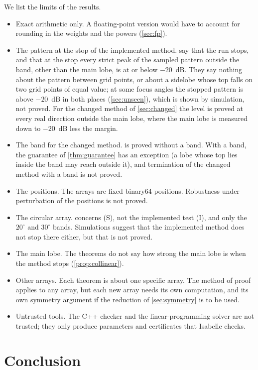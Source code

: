 \documentclass[11pt]{amsart}
\theoremstyle{plain}
\theoremstyle{definition}
\begin{document}
We list the limits of the results.
\begin{itemize}
\item Exact arithmetic only.  A floating-point version would have to account for rounding in the
weights and the powers (\cref{sec:fp}).
\item The pattern at the stop of the implemented method.   say that the run
stops, and that at the stop every strict peak of the sampled pattern outside the band, other than the
main lobe, is at or below $-20$~dB.  They say nothing about the pattern between grid points, or about a
sidelobe whose top falls on two grid points of equal value; at some focus angles the stopped pattern is
above $-20$~dB in both places (\cref{sec:unseen}), which is shown by simulation, not proved.  For the
changed method of \cref{sec:changed} the level is proved at every real direction outside the main lobe,
where the main lobe is measured down to $-20$~dB less the margin.
\item The band for the changed method.   is proved without a band.  With a band, the
guarantee of \cref{thm:guarantee} has an exception (a lobe whose top lies inside the band may reach
outside it), and termination of the changed method with a band is not proved.
\item The positions.  The arrays are fixed binary64 positions.  Robustness under perturbation of the
positions is not proved.
\item The circular array.   concerns (S), not the implemented test (I), and only the
$20^\circ$ and $30^\circ$ bands.  Simulations suggest that the implemented method does not stop there
either, but that is not proved.
\item The main lobe.  The theorems do not say how strong the main lobe is when the method stops
(\cref{prop:collinear}).
\item Other arrays.  Each theorem is about one specific array.  The method of proof applies to any
array, but each new array needs its own computation, and its own symmetry argument if the reduction
of \cref{sec:symmetry} is to be used.
\item Untrusted tools.  The C++ checker and the linear-programming solver are not trusted; they only
produce parameters and certificates that Isabelle checks.
\end{itemize}

\section{Conclusion}
\end{document}
